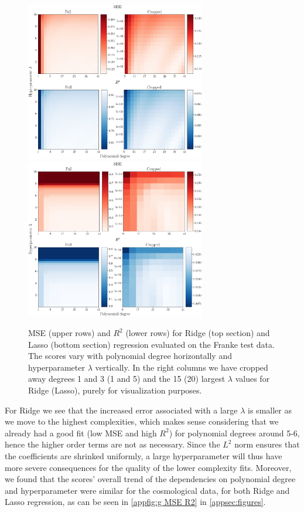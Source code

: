 \documentclass[aps,pra,english,notitlepage,reprint,nofootinbib]{revtex4-1}  %
\begin{document}
\begin{figure}
  \vspace*{-5pt}
  \centering %
  \includegraphics[width=0.7\textwidth]{../figs/b_MSE_R2.pdf}
  \centering
  \includegraphics[width=0.7\textwidth]{../figs/c_MSE_R2.pdf}
  \caption{MSE (upper rows) and $R^2$ (lower rows) for Ridge (top section) and Lasso (bottom section) regression evaluated on the Franke test data. The scores vary with polynomial degree horizontally and hyperparameter $\lambda$ vertically. In the right columns we have cropped away degrees 1 and 3 (1 and 5) and the 15 (20) largest $\lambda$ values for Ridge (Lasso), purely for visualization purposes.}\label{fig:MSE R2}
  \vspace*{-5pt}
\end{figure}

For Ridge we see that the increased error associated with a large $\lambda$ is smaller as we move to the highest complexities, which makes sense considering that we already had a good fit (low MSE and high $R^2$) for polynomial degrees around 5-6, hence the higher order terms are not as necessary. Since the $L^2$ norm ensures that the coefficients are shrinked uniformly, a large hyperparameter will thus have more severe consequences for the quality of the lower complexity fits. Moreover, we found that the scores' overall trend of the dependencies on polynomial degree and hyperparameter were similar for the cosmological data, for both Ridge and Lasso regression, as can be seen in \cref{appfig:g MSE R2} in \cref{appsec:figures}. 
\end{document}
